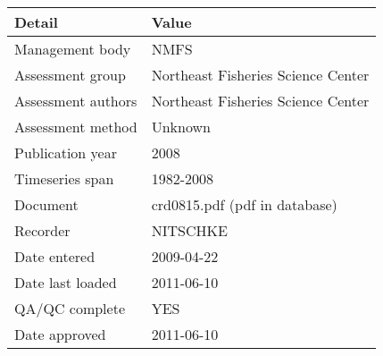 \begin{table}[htb]
\centering
\begin{tabular}{lp{7cm}}
\toprule
Detail & Value \\
\midrule
Management body    & NMFS                               \\
Assessment group   & Northeast Fisheries Science Center \\
Assessment authors & Northeast Fisheries Science Center \\
Assessment method  & Unknown                            \\
Publication year   & 2008                               \\
Timeseries span    & 1982-2008                          \\
Document           & crd0815.pdf (pdf in database)      \\
Recorder           & NITSCHKE                           \\
Date entered       & 2009-04-22                         \\
Date last loaded   & 2011-06-10                         \\
QA/QC complete     & YES                                \\
Date approved      & 2011-06-10                         \\
\bottomrule
\end{tabular}
\label{tab:assessdet}
\end{table}
